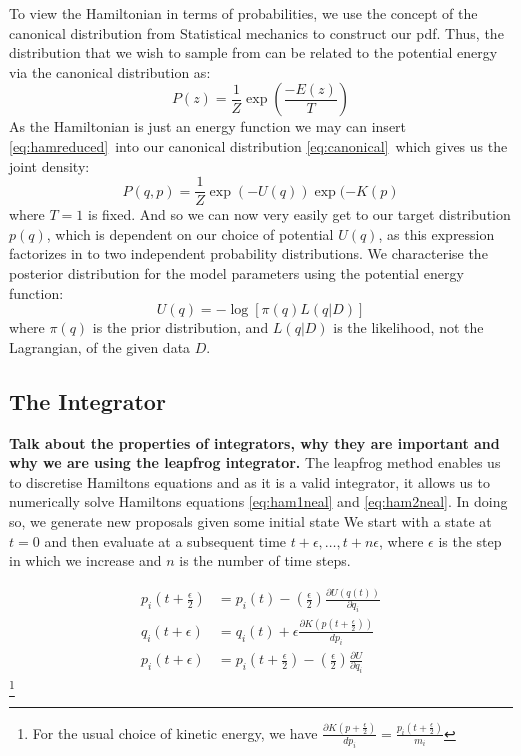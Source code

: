 \documentclass[twoside]{article}
\begin{document}
To view the Hamiltonian in terms of probabilities, we use the concept of the canonical distribution from Statistical mechanics to construct our pdf. Thus, the distribution that we wish to sample from can be related to the potential energy via the canonical distribution as:
\begin{equation}
\label{eq:canonical}
P(z) = \frac{1}{Z}\exp\left(\frac{-E(z)}{T}\right)
\end{equation}
As the Hamiltonian is just an energy function we may can insert \ref{eq:hamreduced}\ into our canonical distribution \ref{eq:canonical}\, which gives us the joint density:
\begin{equation}
P(q,p) = \frac{1}{Z}\exp(-U(q))\exp(-K(p)  
\end{equation}
where $T = 1$ is fixed. And so we can now very easily get to our target distribution $p(q)$, which is dependent on our choice of potential $U(q)$, as this expression factorizes in to two independent probability distributions. 
We characterise the posterior distribution for the model parameters using the potential energy function: \begin{equation}
U(q) = -\log[\pi(q)L(q|D)]
\end{equation}
where $\pi(q)$ is the prior distribution, and $L(q|D)$ is the likelihood, not the Lagrangian, of the given data $D$. 

\subsection{The Integrator}

\textbf{Talk about the properties of integrators, why they are important and why we are using the leapfrog integrator.}
The leapfrog method enables us to discretise Hamiltons equations and as it is a valid integrator, it allows us to numerically solve Hamiltons equations \ref{eq:ham1neal} and \ref{eq:ham2neal}. In doing so, we generate new proposals given some initial state 
We start with a state at $t = 0$ and then evaluate at a subsequent time $t + \epsilon , \hdots, t + n\epsilon$, where $\epsilon$ is the step in which we increase and $n$ is the number of time steps. 

\begin{align}
p_{i}(t + \frac{\epsilon}{2}) &= p_{i}(t) - \left(\frac{\epsilon}{2}\right)\frac{\partial U(q(t))}{\partial q_{i}} \\
q_{i}(t + \epsilon) &= q_{i}(t) + \epsilon\frac{\partial K(p(t + \frac{\epsilon}{2}))}{dp_{i}}\\
p_{i}(t + \epsilon) &= p_{i}(t + \frac{\epsilon}{2}) - \left(\frac{\epsilon}{2}\right)\frac{\partial U}{\partial q_{i}}
\end{align}
\footnote{For the usual choice of kinetic energy, we have $\frac{\partial K(p + \frac{\epsilon}{2})}{dp_{i}} = \frac{p_{i}(t + \frac{\epsilon}{2})}{m_{i}}$}
\end{document}
